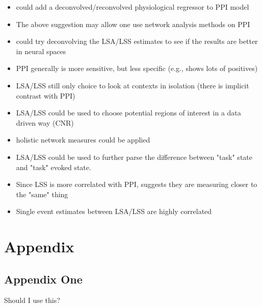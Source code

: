 \documentclass[phd,appendix,figures]{uithesis}
\begin{document}
\begin{itemize}
  \item could add a deconvolved/reconvolved physiological regressor to PPI model
  \item The above suggestion may allow one use network analysis methods on PPI
  \item could try deconvolving the LSA/LSS estimates to see if the results are better in neural spaces
	\item PPI generally is more sensitive, but less specific (e.g., shows lots of positives)
	\item LSA/LSS still only choice to look at contexts in isolation (there is implicit contrast with PPI)
	\item LSA/LSS could be used to choose potential regions of interest in a data driven way (CNR)
	\item holistic network measures could be applied
	\item LSA/LSS could be used to further parse the difference between "task" state and "task" evoked state.
	\item Since LSS is more correlated with PPI, suggests they are measuring closer to the "same" thing
	\item Single event estimates between LSA/LSS are highly correlated
\end{itemize}
\appendix

\chapter{Appendix}

\section{Appendix One}
Should I use this?


 
\end{document}
